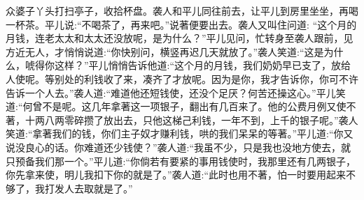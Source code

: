 \begin{parag}
    众婆子丫头打扫亭子，收拾杯盘。袭人和平儿同往前去，让平儿到房里坐坐，再喝一杯茶。平儿说:“不喝茶了，再来吧。”说著便要出去。袭人又叫住问道: “这个月的月钱，连老太太和太太还没放呢，是为什么？”平儿见问，忙转身至袭人跟前，见方近无人，才悄悄说道:“你快别问，横竖再迟几天就放了。”袭人笑道:“这是为什么，唬得你这样？”平儿悄悄告诉他道:“这个月的月钱，我们奶奶早已支了，放给人使呢。等别处的利钱收了来，凑齐了才放呢。因为是你，我才告诉你，你可不许告诉一个人去。”袭人道:“难道他还短钱使，还没个足厌？何苦还操这心。”平儿笑道:“何曾不是呢。这几年拿著这一项银子，翻出有几百来了。他的公费月例又使不著，十两八两零碎攒了放出去，只他这梯己利钱，一年不到，上千的银子呢。”袭人笑道:“拿著我们的钱，你们主子奴才赚利钱，哄的我们呆呆的等著。”平儿道:“你又说没良心的话。你难道还少钱使？”袭人道:“我虽不少，只是我也没地方使去，就只预备我们那一个。”平儿道:“你倘若有要紧的事用钱使时，我那里还有几两银子，你先拿来使，明儿我扣下你的就是了。”袭人道:“此时也用不著，怕一时要用起来不够了，我打发人去取就是了。”
\end{parag}


